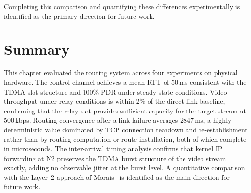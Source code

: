 Completing this comparison and quantifying these differences experimentally
is identified as the primary direction for future work.


\section{Summary}
\label{sec:eval-summary}

This chapter evaluated the routing system across four experiments on
physical hardware. The control channel achieves a mean RTT of 50\,ms
consistent with the TDMA slot structure and 100\% PDR under steady-state
conditions. Video throughput under relay conditions is within 2\% of the
direct-link baseline, confirming that the relay slot provides sufficient
capacity for the target stream at 500\,kbps. Routing convergence after a
link failure averages 2847\,ms, a highly deterministic value dominated by
TCP connection teardown and re-establishment rather than by routing
computation or route installation, both of which complete in microseconds.
The inter-arrival timing analysis confirms that kernel IP forwarding at N2
preserves the TDMA burst structure of the video stream exactly, adding no
observable jitter at the burst level. A quantitative comparison with the
Layer~2 approach of Morais~\cite{morais2024synchronization} is identified as
the main direction for future work.
